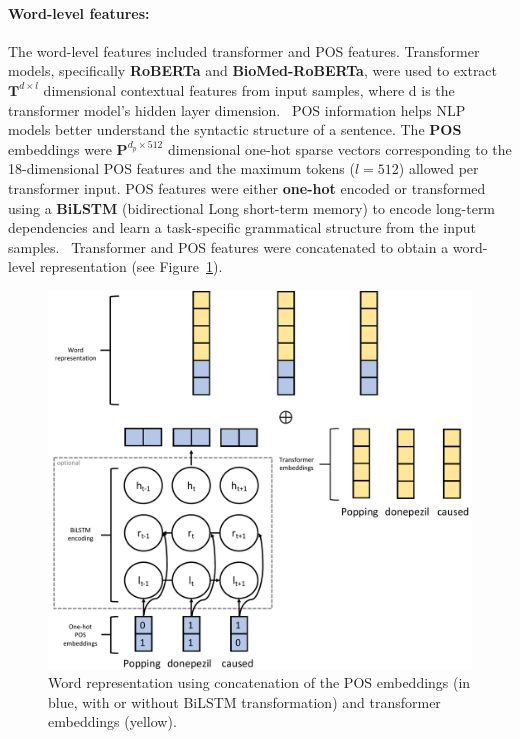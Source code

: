 \documentclass[11pt]{article}
\begin{document}
\paragraph{Word-level features: }
%
The word-level features included transformer and POS features.
Transformer models, specifically \textbf{RoBERTa} and \textbf{BioMed-RoBERTa}, were used to extract $\mathbf{T}^{d \times l}$ dimensional contextual features from input samples, where d is the transformer model's hidden layer dimension.~\cite{liu2019roberta,gururangan2020don}
POS information helps NLP models better understand the syntactic structure of a sentence.
The \textbf{POS} embeddings were $\mathbf{P}^{d_p \times 512}$ dimensional one-hot sparse vectors corresponding to the 18-dimensional POS features and the maximum tokens ($l = 512$) allowed per transformer input. 
POS features were either \textbf{one-hot} encoded or transformed using a \textbf{BiLSTM} (bidirectional Long short-term memory) to encode long-term dependencies and learn a task-specific grammatical structure from the input samples.~\cite{hochreiter1997long}
Transformer and POS features were concatenated to obtain a word-level representation (see Figure~\ref{fig:task2_word}).
\begin{figure}[!htbp]
    \centering
\includegraphics[width=\columnwidth]{figures/word_arch.pdf}
    \caption{Word representation using concatenation of the POS embeddings (in blue, with or without BiLSTM transformation) and transformer embeddings (yellow).}
    \label{fig:task2_word}
\end{figure}
%
%
%
\end{document}
